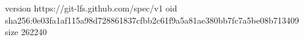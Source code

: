 version https://git-lfs.github.com/spec/v1
oid sha256:0e03fa1af115a98d728861837cfbb2c61f9a5a81ae380bb7fc7a5be08b713409
size 262240
